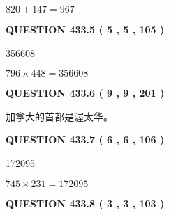 \documentclass{ctexart}
\begin{document}
 
\noindent{}

$ %
820 +  %
147=   %
967$
 
 
  
\vspace{0.2in}
  
{\textbf{\Large{QUESTION
433.5 
 ( 5 , 5 , 105 )
}}}
  
  
 
 
\noindent{}

356608
 
 
 
 
\noindent{}

$ %
796 \times  %
448=   %
356608$
 
 
  
\vspace{0.2in}
  
{\textbf{\Large{QUESTION
433.6 
 ( 9 , 9 , 201 )
}}}
  
  
 
 
\noindent{}
 
 
加拿大的首都是渥太华。
 
 
 
 
  
\vspace{0.2in}
  
{\textbf{\Large{QUESTION
433.7 
 ( 6 , 6 , 106 )
}}}
  
  
 
 
\noindent{}

172095
 
 
 
 
\noindent{}

$ %
745 \times  %
231=   %
172095$
 
 
  
\vspace{0.2in}
  
{\textbf{\Large{QUESTION
433.8 
 ( 3 , 3 , 103 )
}}}
  
  
 
 
\noindent{}
\end{document}
